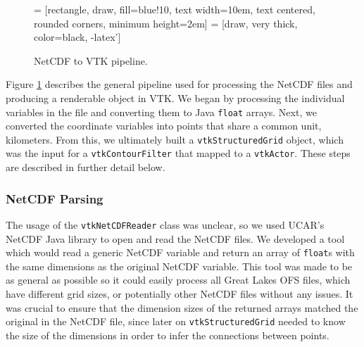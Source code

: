 \documentclass{article} %
\newcommand{\code}[1]{\texttt{#1}}
\begin{document}
\begin{figure}[htb]
\centering
 = [rectangle, draw, fill=blue!10,
    text width=10em, text centered, rounded corners, minimum height=2em]
 = [draw, very thick, color=black, -latex']

\caption{NetCDF to VTK pipeline.}
\label{fig:flowchart}
\end{figure}

Figure \ref{fig:flowchart} describes the general pipeline used for processing the NetCDF files and producing a renderable object in VTK.  We began by processing the individual variables in the file and converting them to Java \code{float} arrays.  Next, we converted the coordinate variables into points that share a common unit, kilometers.  From this, we ultimately built a \code{vtkStructuredGrid} object, which was the input for a \code{vtkContourFilter} that mapped to a \code{vtkActor}.  These steps are described in further detail below.

\subsubsection{NetCDF Parsing}

The usage of the \code{vtkNetCDFReader} class was unclear, so we used UCAR's NetCDF Java library to open and read the NetCDF files.  We developed a tool which would read a generic NetCDF variable and return an array of \code{float}s with the same dimensions as the original NetCDF variable.  This tool was made to be as general as possible so it could easily process all Great Lakes OFS files, which have different grid sizes, or potentially other NetCDF files without any issues.  It was crucial to ensure that the dimension sizes of the returned arrays matched the original in the NetCDF file, since later on \code{vtkStructuredGrid} needed to know the size of the dimensions in order to infer the connections between points.
\end{document}

